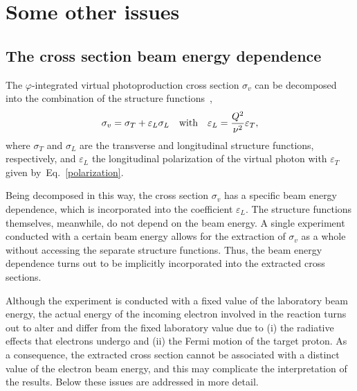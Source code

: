 \chapter{Some other issues}
\label{Sect:issues}


\section{The cross section beam energy dependence}

The $\varphi$-integrated virtual photoproduction cross section $\sigma_{v}$ can be decomposed into the combination of the structure functions~\cite{twopeg,Skorodumina:2016pnb},\vspace{-1.25em}
\begin{equation}
\sigma_{v} = \sigma_{T} + \varepsilon_{L}\sigma_{L}\text{~~~with~~~}\varepsilon_{L}=\frac{Q^{2}}{\nu^{2}}\varepsilon_{T}\\[-10pt],\label{eq:beam_en_dep}
\end{equation}
where $\sigma_{T}$ and $\sigma_{L}$ are the transverse and longitudinal structure functions, respectively, and $\varepsilon_{L}$ the longitudinal polarization of the virtual photon with $\varepsilon_{T}$ given by~Eq.~\eqref{polarization}.

Being decomposed in this way, the cross section $\sigma_{v}$ has a specific beam energy dependence, which is incorporated into the coefficient $\varepsilon_{L}$. The structure functions themselves, meanwhile, do not depend on the beam energy. A single experiment conducted with a certain beam energy allows for the extraction of $\sigma_{v}$ as a whole without accessing the separate structure functions. Thus, the beam energy dependence turns out to be implicitly incorporated into the extracted cross sections.

Although the experiment is conducted with a fixed value of the laboratory beam energy, the actual energy of the incoming electron involved in the reaction turns out to alter and differ from the fixed laboratory value due to  (i) the radiative effects that electrons undergo and (ii) the Fermi motion of the target proton. As a consequence, the extracted cross section cannot be associated with a distinct value of the electron beam energy, and this may complicate the interpretation of the results. Below these issues are addressed in more detail. 


